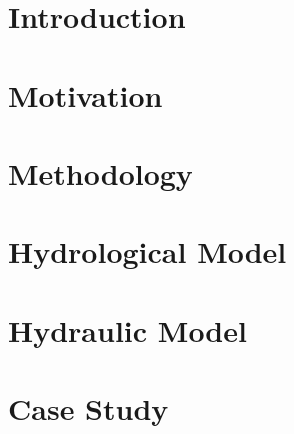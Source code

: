 







\tableofcontents



\chapter{Introduction}



\chapter{Motivation}


\chapter{Methodology}


\chapter{Hydrological Model}


\chapter{Hydraulic Model}


\chapter{Case Study}


\printbibliography


